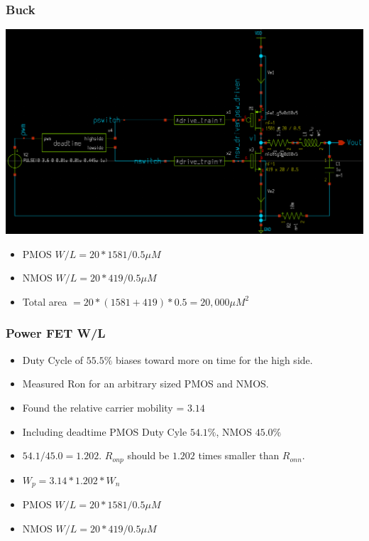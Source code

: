 \documentclass{beamer}
\begin{document}
\begin{frame}
  \frametitle{Buck}
  \includegraphics[scale=0.08]{buck.png}
  \begin{itemize}
  \item PMOS $W/L = 20 * 1581 / 0.5 \mu M$
  \item NMOS $W/L = 20 * 419 / 0.5 \mu M$   
  \item Total area $= 20 * (1581 + 419) * 0.5 = 20,000 \mu M^2$
  \end{itemize}
\end{frame}

\begin{frame}
  \frametitle{Power FET W/L}
  \begin{itemize}
  \item Duty Cycle of $55.5\%$ biases toward more on time for the high side.
  \item Measured Ron for an arbitrary sized PMOS and NMOS.
  \item Found the relative carrier mobility = $3.14$
  \item Including deadtime PMOS Duty Cyle $54.1\%$, NMOS $45.0\%$
  \item $54.1/45.0 = 1.202$.  $R_{onp}$ should be $1.202$ times smaller than $R_{onn}$.
  \item $W_p = 3.14 * 1.202 * W_n$
  \item PMOS $W/L = 20 * 1581 / 0.5 \mu M$
  \item NMOS $W/L = 20 * 419 / 0.5 \mu M$    
  \end{itemize}
\end{frame}
\end{document}
